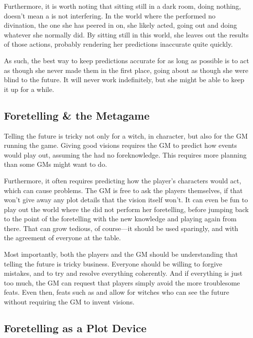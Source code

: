 Furthermore, it is worth noting that sitting still in a dark room, doing nothing, doesn't mean a  is not interfering.
In the world where the performed no divination, the one she has peered in on, she likely acted, going out and doing whatever she normally did.
By sitting still in this world, she leaves out the results of those actions, probably rendering her predictions inaccurate quite quickly.

As such, the best way to keep predictions accurate for as long as possible is to act as though she never made them in the first place, going about as though she were blind to the future.
It will never work indefinitely, but she might be able to keep it up for a while.

\subsection{Foretelling \& the Metagame}

Telling the future is tricky not only for a witch, in character, but also for the GM running the game.
Giving good visions requires the GM to predict how events would play out, assuming the  had no foreknowledge.
This requires more planning than some GMs might want to do.

Furthermore, it often requires predicting how the player's characters would act, which can cause problems.
The GM is free to ask the players themselves, if that won't give away any plot details that the vision itself won't.
It can even be fun to play out the world where the  did not perform her foretelling, before jumping back to the point of the foretelling with the  new knowledge and playing again from there.
That can grow tedious, of course---it should be used sparingly, and with the agreement of everyone at the table.

Most importantly, both the players and the GM should be understanding that telling the future is tricky business.
Everyone should be willing to forgive mistakes, and to try and resolve everything coherently.
And if everything is just too much, the GM can request that players simply avoid the more troublesome feats.
Even then, feats such as  and  allow for witches who can see the future without requiring the GM to invent visions.

\subsection{Foretelling as a Plot Device}

